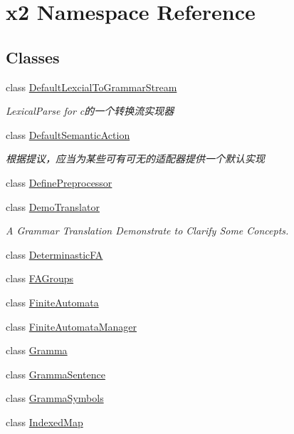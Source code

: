 \hypertarget{namespacex2}{}\section{x2 Namespace Reference}
\label{namespacex2}
\subsection*{Classes}
\begin{DoxyCompactItemize}
\item 
class \hyperlink{classx2_1_1_default_lexcial_to_grammar_stream}{Default\+Lexcial\+To\+Grammar\+Stream}
\begin{DoxyCompactList}\small\item\em Lexical\+Parse for c的一个转换流实现器 \end{DoxyCompactList}\item 
class \hyperlink{classx2_1_1_default_semantic_action}{Default\+Semantic\+Action}
\begin{DoxyCompactList}\small\item\em 根据提议，应当为某些可有可无的适配器提供一个默认实现 \end{DoxyCompactList}\item 
class \hyperlink{classx2_1_1_define_preprocessor}{Define\+Preprocessor}
\item 
class \hyperlink{classx2_1_1_demo_translator}{Demo\+Translator}
\begin{DoxyCompactList}\small\item\em A Grammar Translation Demonstrate to Clarify Some Concepts. \end{DoxyCompactList}\item 
class \hyperlink{classx2_1_1_determinastic_f_a}{Determinastic\+FA}
\item 
class \hyperlink{classx2_1_1_f_a_groups}{F\+A\+Groups}
\item 
class \hyperlink{classx2_1_1_finite_automata}{Finite\+Automata}
\item 
class \hyperlink{classx2_1_1_finite_automata_manager}{Finite\+Automata\+Manager}
\item 
class \hyperlink{classx2_1_1_gramma}{Gramma}
\item 
class \hyperlink{classx2_1_1_gramma_sentence}{Gramma\+Sentence}
\item 
class \hyperlink{classx2_1_1_gramma_symbols}{Gramma\+Symbols}
\item 
class \hyperlink{classx2_1_1_indexed_map}{Indexed\+Map}
\item 

\end{DoxyCompactItemize}
